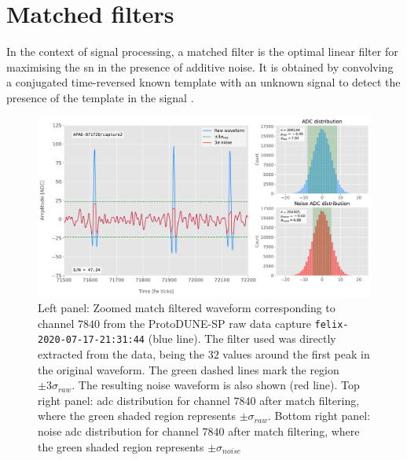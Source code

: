 \section{Matched filters}
\label{sec:matched_filter_matched_filter}

In the context of signal processing, a matched filter is the optimal linear filter for maximising the \gls{sn} in the presence of additive noise. It is obtained by convolving a conjugated time-reversed known template with an unknown signal to detect the presence of the template in the signal \cite{Turin1960}.

\begin{figure}[t]
	\centering
	\includegraphics[width=1\linewidth]{Images/Matched_Filter/waveform_example_mf}
	\caption[Example matched filtered waveform from a ProtoDUNE-SP raw data capture.]{Left panel: Zoomed match filtered waveform corresponding to channel $7840$ from the ProtoDUNE-SP raw data capture \texttt{felix-2020-07-17-21:31:44} (blue line). The filter used was directly extracted from the data, being the $32$ values around the first peak in the original waveform. The green dashed lines mark the region $\pm3\sigma_{raw}$. The resulting noise waveform is also shown (red line). Top right panel: \gls{adc} distribution for channel $7840$ after match filtering, where the green shaded region represents $\pm \sigma_{raw}$. Bottom right panel: noise \gls{adc} distribution for channel $7840$ after match filtering, where the green shaded region represents $\pm \sigma_{noise}$}
	\label{fig:adcs_mf}
\end{figure}


